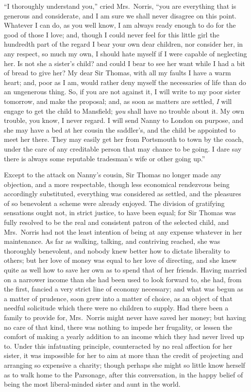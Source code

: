 \documentclass{article}
\begin{document}
``I thoroughly understand you,'' cried Mrs.\ Norris,
``you are everything that is generous and considerate,
and I am sure we shall never disagree on this point.
Whatever I can do, as you well know, I am always ready
enough to do for the good of those I love; and, though I
could never feel for this little girl the hundredth
part of the regard I bear your own dear children,
nor consider her, in any respect, so much my own,
I should hate myself if I were capable of neglecting her.
Is not she a sister's child? and could I bear to see
her want while I had a bit of bread to give her?
My dear Sir Thomas, with all my faults I have a warm heart;
and, poor as I am, would rather deny myself the necessaries
of life than do an ungenerous thing.  So, if you are not
against it, I will write to my poor sister tomorrow,
and make the proposal; and, as soon as matters are settled,
\emph{I} will engage to get the child to Mansfield; \emph{you} shall
have no trouble about it.  My own trouble, you know,
I never regard.  I will send Nanny to London on purpose,
and she may have a bed at her cousin the saddler's, and the
child be appointed to meet her there.  They may easily get
her from Portsmouth to town by the coach, under the care
of any creditable person that may chance to be going.
I dare say there is always some reputable tradesman's wife
or other going up.''

Except to the attack on Nanny's cousin, Sir Thomas no longer
made any objection, and a more respectable, though less
economical rendezvous being accordingly substituted,
everything was considered as settled, and the pleasures
of so benevolent a scheme were already enjoyed.
The division of gratifying sensations ought not,
in strict justice, to have been equal; for Sir Thomas was
fully resolved to be the real and consistent patron of the
selected child, and Mrs.\ Norris had not the least intention
of being at any expense whatever in her maintenance.
As far as walking, talking, and contriving reached,
she was thoroughly benevolent, and nobody knew better
how to dictate liberality to others; but her love of money
was equal to her love of directing, and she knew quite as
well how to save her own as to spend that of her friends.
Having married on a narrower income than she had been
used to look forward to, she had, from the first,
fancied a very strict line of economy necessary;
and what was begun as a matter of prudence, soon grew
into a matter of choice, as an object of that needful
solicitude which there were no children to supply.
Had there been a family to provide for, Mrs.\ Norris might
never have saved her money; but having no care of that kind,
there was nothing to impede her frugality, or lessen the
comfort of making a yearly addition to an income which they
had never lived up to.  Under this infatuating principle,
counteracted by no real affection for her sister,
it was impossible for her to aim at more than the credit
of projecting and arranging so expensive a charity;
though perhaps she might so little know herself as to
walk home to the Parsonage, after this conversation,
in the happy belief of being the most liberal-minded
sister and aunt in the world.
\end{document}

